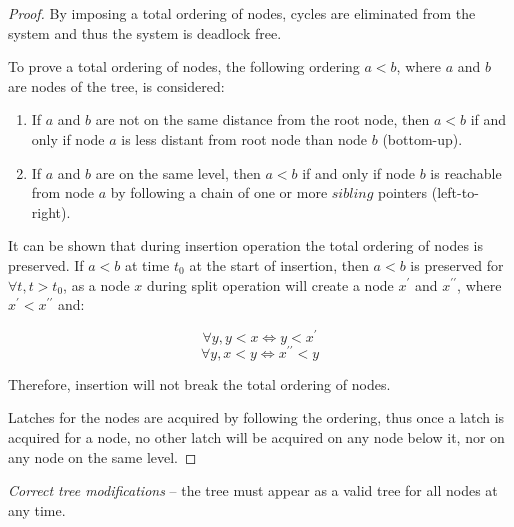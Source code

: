 \begin{proof}
  By imposing a total ordering of nodes, cycles are eliminated from the system and thus the system is deadlock free.

  To prove a total ordering of nodes, the following ordering $a < b$, where $a$ and $b$ are nodes of the tree, is considered:

  \begin{enumerate}
    \item If $a$ and $b$ are not on the same distance from the root node, then $a < b$ if and only if node $a$ is less distant from root node than node $b$ (bottom-up).
    \item If $a$ and $b$ are on the same level, then $a < b$ if and only if node $b$ is reachable from node $a$ by following a chain of one or more $sibling$ pointers (left-to-right).
  \end{enumerate}

  It can be shown that during insertion operation the total ordering of nodes is preserved. If $a < b$ at time $t_0$ at the start of insertion, then $a < b$ is preserved for $\forall t, t > t_0$, as a node $x$ during split operation will create a node $x^\prime$ and $x^{\prime\prime}$, where $x^\prime < x^{\prime\prime}$ and:

  $$\forall y, y < x \Leftrightarrow y < x^\prime$$
  $$\forall y, x < y \Leftrightarrow x^{\prime\prime} < y$$

  Therefore, insertion will not break the total ordering of nodes.

  Latches for the nodes are acquired by following the ordering, thus once a latch is acquired for a node, no other latch will be acquired on any node below it, nor on any node on the same level.
\end{proof}

\begin{theorem}
  \textit{Correct tree modifications} -- the tree must appear as a valid tree for all nodes at any time.
\end{theorem}


